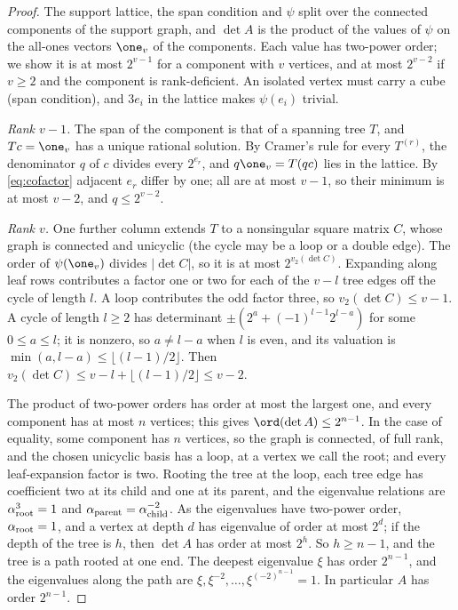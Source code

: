 \begin{proof}
The support lattice, the span condition and $\psi$ split over the connected
components of the support graph, and $\det A$ is the product of the values of
$\psi$ on the all-ones vectors $\one_v$ of the components. Each value has
two-power order; we show it is at most $2^{v-1}$ for a component with $v$
vertices, and at most $2^{v-2}$ if $v\ge2$ and the component is rank-deficient.
An isolated vertex must carry a cube (span condition), and $3e_i$ in the
lattice makes $\psi(e_i)$ trivial.

\emph{Rank $v-1$.} The span of the component is that of a spanning tree $T$,
and $Tc=\one_v$ has a unique rational solution. By Cramer's rule for every
$T^{(r)}$, the denominator $q$ of $c$ divides every $2^{e_r}$, and
$q\one_v=T(qc)$ lies in the lattice. By \eqref{eq:cofactor} adjacent $e_r$
differ by one; all are at most $v-1$, so their minimum is at most $v-2$, and
$q\le2^{v-2}$.

\emph{Rank $v$.} One further column extends $T$ to a nonsingular square
matrix $C$, whose graph is connected and unicyclic (the cycle may be a loop or
a double edge). The order of $\psi(\one_v)$ divides $|\det C|$, so it is at
most $2^{v_2(\det C)}$. Expanding along leaf rows contributes a factor one or
two for each of the $v-l$ tree edges off the cycle of length $l$. A loop
contributes the odd factor three, so $v_2(\det C)\le v-1$. A cycle of length
$l\ge2$ has determinant $\pm(2^a+(-1)^{l-1}2^{l-a})$ for some $0\le a\le l$;
it is nonzero, so $a\ne l-a$ when $l$ is even, and its valuation is
$\min(a,l-a)\le\lfloor(l-1)/2\rfloor$. Then $v_2(\det C)\le v-l+
\lfloor(l-1)/2\rfloor\le v-2$.

The product of two-power orders has order at most the largest one, and every
component has at most $n$ vertices; this gives $\ord(\det A)\le2^{n-1}$. In the
case of equality, some component has $n$ vertices, so the graph is connected,
of full rank, and the chosen unicyclic basis has a loop, at a vertex we call
the root; and every leaf-expansion factor is two. Rooting the tree at the
loop, each tree edge has coefficient two at its child and one at its parent,
and the eigenvalue relations are $\alpha_{\rm root}^3=1$ and
$\alpha_{\rm parent}=\alpha_{\rm child}^{-2}$. As the eigenvalues have two-power
order, $\alpha_{\rm root}=1$, and a vertex at depth $d$ has eigenvalue of order
at most $2^d$; if the depth of the tree is $h$, then $\det A$ has order at most
$2^h$. So $h\ge n-1$, and the tree is a path rooted at one end. The deepest
eigenvalue $\xi$ has order $2^{n-1}$, and the eigenvalues along the path are
$\xi,\xi^{-2},\dots,\xi^{(-2)^{n-1}}=1$. In particular $A$ has order $2^{n-1}$.


\end{proof}
